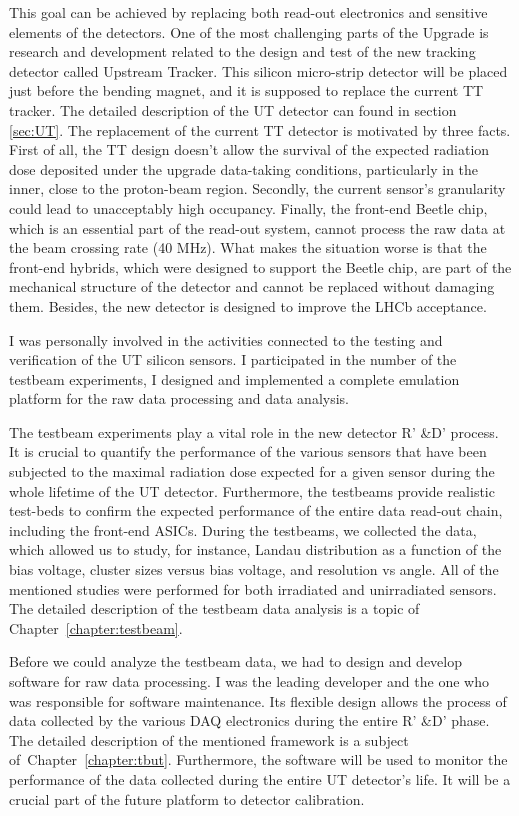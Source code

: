 This goal can be achieved by replacing both read-out electronics and sensitive elements of the detectors. One of the most challenging parts of the Upgrade is research and development related to the design and test of the new tracking detector called Upstream Tracker. This silicon micro-strip detector will be placed just before the bending magnet, and it is supposed to replace the current TT tracker. The detailed description of the UT detector can found in section \ref{sec:UT}.  The replacement of the current TT detector is motivated by three facts. First of all, the TT design doesn't allow the survival of the expected radiation dose deposited under the upgrade data-taking conditions, particularly in the inner, close to the proton-beam region. Secondly, the current sensor's granularity could lead to unacceptably high occupancy. Finally, the front-end Beetle chip, which is an essential part of the read-out system, cannot process the raw data at the beam crossing rate (40 MHz). What makes the situation worse is that the front-end hybrids, which were designed to support the Beetle chip, are part of the mechanical structure of the detector and cannot be replaced without damaging them. Besides, the new detector is designed to improve the LHCb acceptance. 

I was personally involved in the activities connected to the testing and verification of the UT silicon sensors. I participated in the number of the testbeam experiments, I designed and implemented a complete emulation platform for the raw data processing and data analysis. 

The testbeam experiments play a vital role in the new detector R' \&D' process. It is crucial to quantify the performance of the various sensors that have been subjected to the maximal radiation dose expected for a given sensor during the whole lifetime of the UT detector. Furthermore, the testbeams provide realistic test-beds to confirm the expected performance of the entire data read-out chain, including the front-end ASICs. During the testbeams, we collected the data, which allowed us to study, for instance, Landau distribution as a function of the bias voltage, cluster sizes versus bias voltage, and resolution vs angle. All of the mentioned studies were performed for both irradiated and unirradiated sensors. The detailed description of the testbeam data analysis is a topic of Chapter~\ref{chapter:testbeam}.

Before we could analyze the testbeam data, we had to design and develop software for raw data processing. I was the leading developer and the one who was responsible for software maintenance.  Its flexible design allows the process of data collected by the various DAQ electronics during the entire R' \&D' phase. The detailed description of the mentioned framework is a subject of~Chapter~\ref{chapter:tbut}. Furthermore, the software will be used to monitor the performance of the data collected during the entire UT detector's life. It will be a crucial part of the future platform to detector calibration. 

